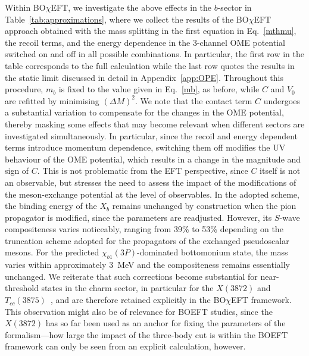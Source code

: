 \documentclass[aps,prd,showpacs,amsmath,twocolumn,superscriptaddress,floatfix,nofootinbib,notitlepage]{revtex4-2}
\newcommand{\X}{X(3872)}
\newcommand{\Xb}{X_b}
\newcommand{\BOchiEFT}{BO$\chi$EFT\xspace}
\begin{document}
Within \BOchiEFT, we investigate the above effects in the $b$-sector in Table~\ref{tab:approximations}, where we collect the results of the \BOchiEFT approach obtained with the mass splitting in the first equation in Eq.~\eqref{mthmu}, the recoil terms, and the energy dependence in the 3-channel OME potential switched on and off in all possible combinations. In particular, the first row in the table corresponds to the full calculation while the last row quotes the results in the static limit discussed in detail in Appendix~\ref{app:OPE}.
Throughout this procedure, $m_b$ is fixed to the value given in Eq.~\eqref{mb}, as before, while $C$ and $V_0$ are refitted by minimising $(\Delta M)^2$.
We note that the contact term $C$ undergoes a substantial variation to compensate for the changes in the OME potential, thereby masking some effects that may become relevant when different sectors are investigated simultaneously. In particular, since the recoil and energy dependent terms introduce momentum dependence, switching them off modifies the UV behaviour of the OME potential,
which results in a change in the magnitude and sign of $C$. 
This is not problematic from the EFT perspective, since $C$ itself is not an observable, but stresses the need to assess the impact of the modifications of the meson-exchange potential at the level of observables. In the adopted scheme, the binding energy of the $\Xb$ remains unchanged by construction when the pion propagator is modified,
since the parameters are readjusted. However, its $S$-wave compositeness varies noticeably, ranging from 39\% to 53\% depending on the truncation scheme adopted for the propagators of the exchanged pseudoscalar mesons.
For the predicted $\chi_{b1}(3P)$-dominated bottomonium state, the mass varies within approximately 3~MeV and the compositeness remains essentially unchanged.
We reiterate that such corrections become substantial for near-threshold states in the charm sector, in particular for the $\X$ and $T_{cc}(3875)$~\cite{Baru:2011rs,Du:2021zzh,Ji:2025hjw}, and are therefore retained explicitly in the \BOchiEFT framework. This observation might also be of relevance for BOEFT studies, since the $\X$ has so far been used as an anchor for fixing the parameters of the formalism---how large the impact of the
three-body cut is within
the BOEFT framework can only be
seen from an explicit calculation, however.
\end{document}
